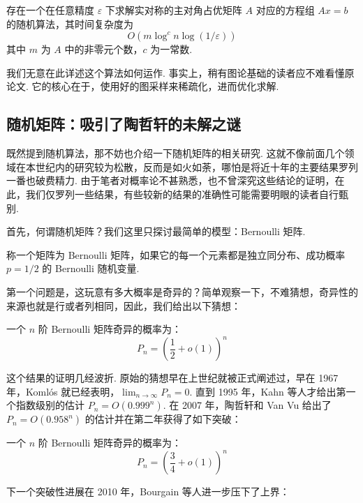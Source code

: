 \begin{theorem}
    存在一个在任意精度 $\varepsilon$ 下求解实对称的主对角占优矩阵 $A$ 对应的方程组 $Ax = b$ 的随机算法，其时间复杂度为
    \[
    O(m \log^c n \log(1 / \varepsilon))
    \]
    其中 $m$ 为 $A$ 中的非零元个数，$c$ 为一常数.
\end{theorem}

我们无意在此详述这个算法如何运作. 事实上，稍有图论基础的读者应不难看懂原论文. 它的核心在于，使用好的图采样来稀疏化，进而优化求解.

\subsection{随机矩阵：吸引了陶哲轩的未解之谜}

既然提到随机算法，那不妨也介绍一下随机矩阵的相关研究. 这就不像前面几个领域在本世纪内的研究较为松散，反而是如火如荼，哪怕是将近十年的主要结果罗列一番也破费精力. 由于笔者对概率论不甚熟悉，也不曾深究这些结论的证明，在此，我们仅罗列一些结果，有些较新的结果的准确性可能需要明眼的读者自行甄别.

首先，何谓随机矩阵？我们这里只探讨最简单的模型：Bernoulli 矩阵.

\begin{definition}
    称一个矩阵为 Bernoulli 矩阵，如果它的每一个元素都是独立同分布、成功概率 $p = 1/2$ 的 Bernoulli 随机变量.
\end{definition}

第一个问题是，这玩意有多大概率是奇异的？简单观察一下，不难猜想，奇异性的来源也就是行或者列相同，因此，我们给出以下猜想：

\begin{theorem}[Tikhomirov, 2020]\label{thm:16:tik2020}
    一个 $n$ 阶 Bernoulli 矩阵奇异的概率为：
    \[
    P_n = \left( \frac{1}{2} + o(1) \right)^n
    \]
\end{theorem}

这个结果的证明几经波折. 原始的猜想早在上世纪就被正式阐述过，早在 1967 年，Koml\'os 就已经表明，$\lim_{n \to \infty} P_n = 0$. 直到 1995 年，Kahn 等人才给出第一个指数级别的估计 $P_n = O(0.999^n)$. 在 2007 年，陶哲轩和 Van Vu 给出了 $P_n = O(0.958^n)$ 的估计并在第二年获得了如下突破：

\begin{theorem}[Tao-Vu, 2007]
    一个 $n$ 阶 Bernoulli 矩阵奇异的概率为：
    \[
    P_n = \left( \frac{3}{4} + o(1) \right)^n
    \]
\end{theorem}

下一个突破性进展在 2010 年，Bourgain 等人进一步压下了上界：

